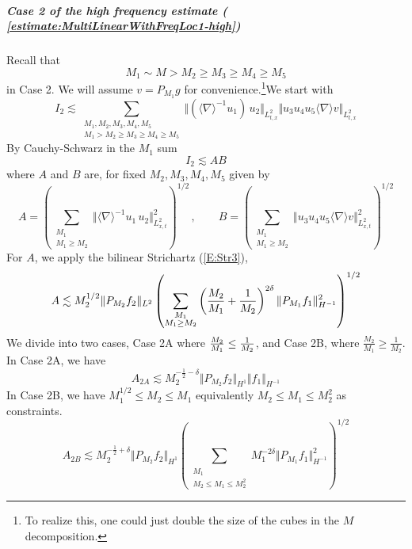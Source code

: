 \documentclass[12pt,letterpaper,leqno]{amsart}
\theoremstyle{plain}
\numberwithin{equation}{section}
\numberwithin{theorem}{section}
\numberwithin{proposition}{section}
\numberwithin{lemma}{section}
\numberwithin{corollary}{section}
\begin{document}
\subparagraph{\noindent \textit{Case 2 of the high frequency estimate (%
\protect\ref{estimate:MultiLinearWithFreqLoc1-high})}}

Recall that 
\begin{equation*}
M_{1}\sim M>M_{2}\geq M_{3}\geq M_{4}\geq M_{5}
\end{equation*}%
in Case 2. We will assume $v=P_{M_{1}}g$ for convenience.\footnote{%
To realize this, one could just double the size of the cubes in the $M$
decomposition.}We start with 
\begin{equation*}
I_{2}\lesssim \sum_{\substack{ M_{1},M_{2},M_{3},M_{4},M_{5}  \\ %
M_{1}>M_{2}\geq M_{3}\geq M_{4}\geq M_{5}}}\Vert (\langle \nabla \rangle
^{-1}u_{1})\,u_{2}\Vert _{L_{t,x}^{2}}\Vert u_{3}u_{4}u_{5}\langle \nabla
\rangle v\Vert _{L_{t,x}^{2}}
\end{equation*}%
By Cauchy-Schwarz in the $M_{1}$ sum 
\begin{equation*}
I_{2}\lesssim AB
\end{equation*}%
where $A$ and $B$ are, for fixed $M_{2},M_{3},M_{4},M_{5}$ given by 
\begin{equation*}
A=\left( \sum_{\substack{ M_{1}  \\ M_{1}\geq M_{2}}}\Vert \langle \nabla
\rangle ^{-1}u_{1}\,u_{2}\Vert _{L_{x,t}^{2}}^{2}\right) ^{1/2}\,,\qquad
B=\left( \sum_{\substack{ M_{1}  \\ M_{1}\geq M_{2}}}\Vert
u_{3}u_{4}u_{5}\langle \nabla \rangle v\Vert _{L_{x,t}^{2}}^{2}\right) ^{1/2}
\end{equation*}%
For $A$, we apply the bilinear Strichartz (\ref{E:Str3}), 
\begin{equation*}
A\lesssim M_{2}^{1/2}\Vert P_{M_{2}}f_{2}\Vert _{L^{2}}\left( \sum 
_{\substack{ M_{1}  \\ M_{1}\geq M_{2}}}\left( \frac{M_{2}}{M_{1}}+\frac{1}{%
M_{2}}\right) ^{2\delta }\Vert P_{M_{1}}f_{1}\Vert _{H^{-1}}^{2}\right)
^{1/2}
\end{equation*}%
We divide into two cases, Case 2A where $\frac{M_{2}}{M_{1}}\leq \frac{1}{%
M_{2}}$, and Case 2B, where $\frac{M_{2}}{M_{1}}\geq \frac{1}{M_{2}}$. In
Case 2A, we have 
\begin{equation*}
A_{2A}\lesssim M_{2}^{-\frac{1}{2}-\delta }\Vert P_{M_{2}}f_{2}\Vert
_{H^{1}}\Vert f_{1}\Vert _{H^{-1}}
\end{equation*}%
In Case 2B, we have $M_{1}^{1/2}\leq M_{2}\leq M_{1}$ equivalently $%
M_{2}\leq M_{1}\leq M_{2}^{2}$ as constraints. 
\begin{equation*}
A_{2B}\lesssim M_{2}^{-\frac{1}{2}+\delta }\Vert P_{M_{2}}f_{2}\Vert
_{H^{1}}\left( \sum_{\substack{ M_{1}  \\ M_{2}\leq M_{1}\leq M_{2}^{2}}}%
M_{1}^{-2\delta }\Vert P_{M_{1}}f_{1}\Vert _{H^{-1}}^{2}\right) ^{1/2}
\end{equation*}%
\end{document}
